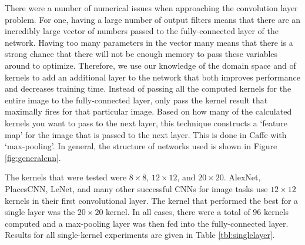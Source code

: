 \documentclass[10pt]{article}
\begin{document}
There were a number of numerical issues when approaching the convolution layer problem. For one, having a large number of output filters means that there are an incredibly large vector of numbers passed to the fully-connected layer of the network. Having too many parameters in the vector many means that there is a strong chance that there will not be enough memory to pass these variables around to optimize. Therefore, we use our knowledge of the domain space and of kernels to add an additional layer to the network that both improves performance and decreases training time. Instead of passing all the computed kernels for the entire image to the fully-connected layer, only pass the kernel result that maximally fires for that particular image. Based on how many of the calculated kernels you want to pass to the next layer, this technique constructs a `feature map' for the image that is passed to the next layer. This is done in Caffe with `max-pooling'. In general, the structure of networks used is shown in Figure \ref{fig:generalcnn}. 

The kernels that were tested were $8 \times 8$, $12 \times 12$, and $20 \times 20$. AlexNet, PlacesCNN, LeNet, and many other successful CNNs for image tasks use $12 \times 12$ kernels in their first convolutional layer. The kernel that performed the best for a single layer was the $20 \times 20$ kernel. In all cases, there were a total of $96$ kernels computed and a max-pooling layer was then fed into the fully-connected layer. Results for all single-kernel experiments are given in Table \ref{tbl:singlelayer}.

\begin{table}[!ht]
\centering
{}
\caption{Summary of top-1 and top-5 accuracy results on single-layer networks after 20000 iterations}
\label{tbl:singlelayer}
\end{table}
\end{document}
